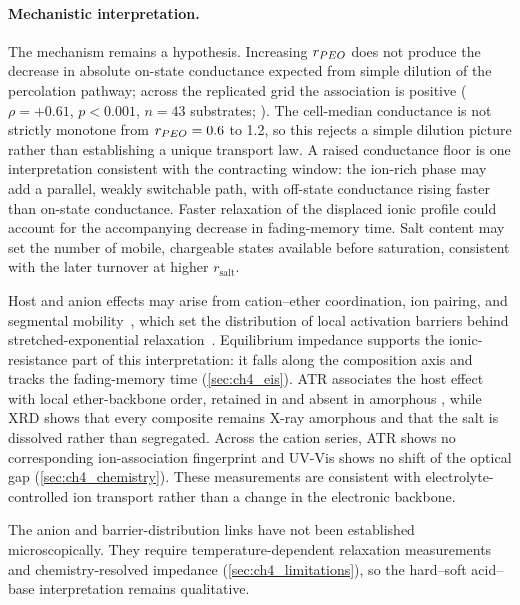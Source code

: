\documentclass[12pt, twoside]{report}
\begin{document}
\paragraph{Mechanistic interpretation.} The mechanism remains a hypothesis. Increasing \(r_{PEO{}}\) does not produce the decrease in absolute on-state conductance expected from simple dilution of the \SY{} percolation pathway; across the replicated grid the association is positive (\(\rho=+0.61\), \(p<0.001\), \(n=43\) substrates; ). The cell-median conductance is not strictly monotone from \(r_{PEO{}}=\num{0.6}\) to \num{1.2}, so this rejects a simple dilution picture rather than establishing a unique transport law. A raised conductance floor is one interpretation consistent with the contracting window: the ion-rich phase may add a parallel, weakly switchable path, with off-state conductance rising faster than on-state conductance. Faster relaxation of the displaced ionic profile could account for the accompanying decrease in fading-memory time. Salt content may set the number of mobile, chargeable states available before saturation, consistent with the later turnover at higher \(r_{\mathrm{salt}}\).

Host and anion effects may arise from cation--ether coordination, ion pairing, and segmental mobility~\cite{RatnerShriver1988,BruceVincent1993}, which set the distribution of local activation barriers behind stretched-exponential relaxation~\cite{Sturman2003}. Equilibrium impedance supports the ionic-resistance part of this interpretation: it falls along the composition axis and tracks the fading-memory time (\cref{sec:ch4_eis}). ATR associates the host effect with local ether-backbone order, retained in \PEO{} and absent in amorphous \TMPE{}, while XRD shows that every composite remains X-ray amorphous and that the salt is dissolved rather than segregated. Across the cation series, ATR shows no corresponding ion-association fingerprint and UV-Vis shows no shift of the \SY{} optical gap (\cref{sec:ch4_chemistry}). These measurements are consistent with electrolyte-controlled ion transport rather than a change in the \SY{} electronic backbone.

The anion and barrier-distribution links have not been established microscopically. They require temperature-dependent relaxation measurements and chemistry-resolved impedance (\cref{sec:ch4_limitations}), so the hard--soft acid--base interpretation remains qualitative.
\end{document}
